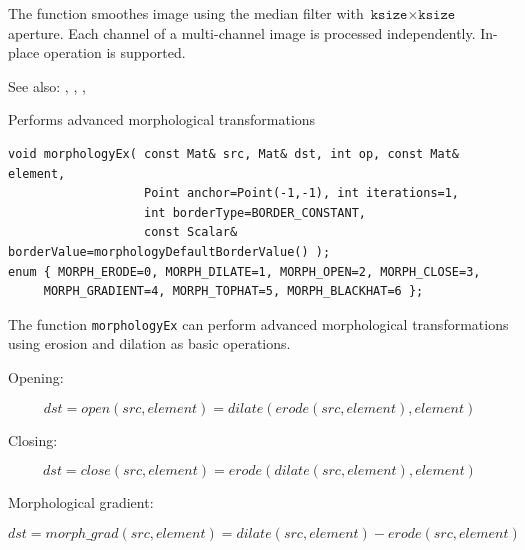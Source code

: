 The function smoothes image using the median filter with $\texttt{ksize} \times \texttt{ksize}$ aperture. Each channel of a multi-channel image is processed independently. In-place operation is supported.

See also: , , , 

\label{morphologyEx}
Performs advanced morphological transformations

\begin{lstlisting}
void morphologyEx( const Mat& src, Mat& dst, int op, const Mat& element,
                   Point anchor=Point(-1,-1), int iterations=1,
                   int borderType=BORDER_CONSTANT,
                   const Scalar& borderValue=morphologyDefaultBorderValue() );
enum { MORPH_ERODE=0, MORPH_DILATE=1, MORPH_OPEN=2, MORPH_CLOSE=3,
     MORPH_GRADIENT=4, MORPH_TOPHAT=5, MORPH_BLACKHAT=6 };
\end{lstlisting}
\begin{description}
\end{description}

The function \texttt{morphologyEx} can perform advanced morphological transformations using erosion and dilation as basic operations.

Opening:

\[
dst=open(src,element)=dilate(erode(src,element),element)
\]

Closing:

\[
dst=close(src,element)=erode(dilate(src,element),element)
\]

Morphological gradient:

\[
dst=morph\_grad(src,element)=dilate(src,element)-erode(src,element)
\]

